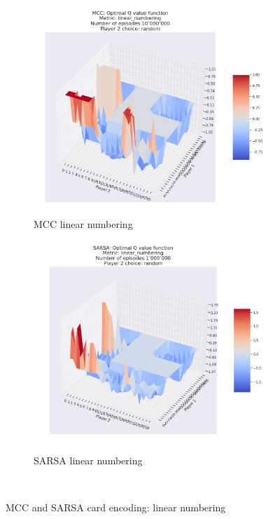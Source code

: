 \begin{figure}[ht!]
    \begin{subfigure}{0.5\textwidth}
        \includegraphics[width=1\linewidth]{Figures/mcc_linear_numbering_10000000_random} 
        \caption[MCC linear numbering]{MCC linear numbering}
        \label{fig:mcc linear_numbering}
    \end{subfigure}
    \begin{subfigure}{0.5\textwidth}
        \includegraphics[width=1\linewidth]{Figures/SARSA_linear_numbering_1000000_random}
        \caption[SARSA linear numbering]{SARSA linear numbering}
        \label{fig:sarsa linear numbering}
    \end{subfigure} \\
    \caption{MCC and SARSA card encoding: linear numbering}
\label{fig:MCC and SARSA card encoding: linear numbering}
\end{figure}

